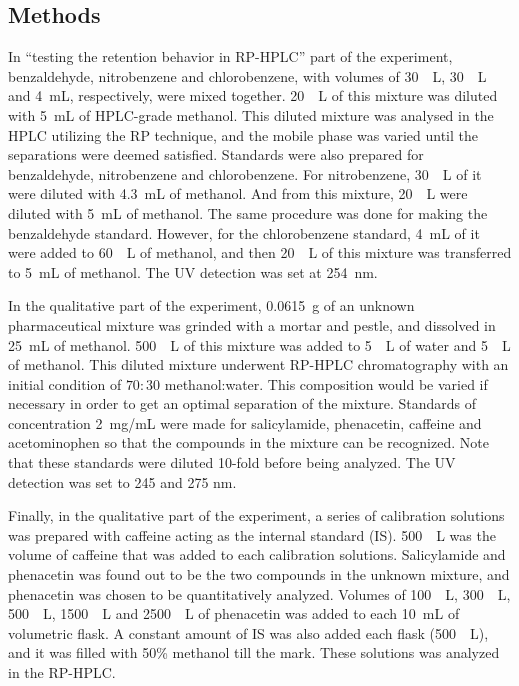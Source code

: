 \documentclass[a4paper, 12pt]{article}
\begin{document}
\subsection{Methods}
In ``testing the retention behavior in RP-HPLC'' part of the experiment, benzaldehyde, nitrobenzene and chlorobenzene, with volumes of \SI{30}{\mu{}L}, \SI{30}{\mu{}L} and \SI{4}{mL}, respectively, were mixed together. \SI{20}{\mu{}L} of this mixture was diluted with \SI{5}{mL} of HPLC-grade methanol. This diluted mixture was analysed in the HPLC utilizing the RP technique, and the mobile phase was varied until the separations were deemed satisfied. Standards were also prepared for benzaldehyde, nitrobenzene and chlorobenzene. For nitrobenzene, \SI{30}{\mu{}L} of it were diluted with \SI{4.3}{mL} of methanol. And from this mixture, \SI{20}{\mu{}L} were diluted with \SI{5}{mL} of methanol. The same procedure was done for making the benzaldehyde standard. However, for the chlorobenzene standard, \SI{4}{mL} of it were added to \SI{60}{\mu{}L} of methanol, and then \SI{20}{\mu{}L} of this mixture was transferred to \SI{5}{mL} of methanol. The UV detection was set at \SI{254}{nm}.

In the qualitative part of the experiment, \SI{0.0615}{g} of an unknown pharmaceutical mixture was grinded with a mortar and pestle, and dissolved in \SI{25}{mL} of methanol. \SI{500}{\mu{}L} of this mixture was added to \SI{5}{\mu{}L} of water and \SI{5}{\mu{}L} of methanol. This diluted mixture underwent RP-HPLC chromatography with an initial condition of $70:30$ methanol:water. This composition would be varied if necessary in order to get an optimal separation of the mixture. Standards of concentration \SI{2}{mg/mL} were made for salicylamide, phenacetin, caffeine and acetominophen so that the compounds in the mixture can be recognized. Note that these standards were diluted \num{10}-fold before being analyzed. The UV detection was set to \num{245} and \num{275} \si{nm}.

Finally, in the qualitative part of the experiment, a series of calibration solutions was prepared with caffeine acting as the internal standard (IS). \SI{500}{\mu{}L} was the volume of caffeine that was added to each calibration solutions. Salicylamide and phenacetin was found out to be the two compounds in the unknown mixture, and phenacetin was chosen to be quantitatively analyzed. Volumes of \SI{100}{\mu{}L}, \SI{300}{\mu{}L}, \SI{500}{\mu{}L}, \SI{1500}{\mu{}L} and \SI{2500}{\mu{}L} of phenacetin was added to each \SI{10}{mL} of volumetric flask. A constant amount of IS was also added each flask (\SI{500}{\mu{}L}), and it was filled with 50\% methanol till the mark. These solutions was analyzed in the RP-HPLC.
\end{document}
